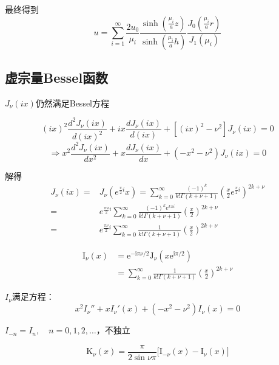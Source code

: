 \begin{ex}
\noindent 最终得到
$$u=\sum_{i=1}^{\infty}\frac{2u_{0}}{\mu_{i}}\frac{\sinh(\frac{\mu_{i}}{a}z)}{\sinh(\frac{\mu_{i}}{a}h)}\frac{J_{0}(\frac{\mu_{i}}{a}r)}{J_{1}(\mu_{i})}$$
\end{ex}

\subsection{虚宗量Bessel函数}
$J_\nu(ix)$仍然满足Bessel方程

$$(ix)^{2}\frac{d^{2}J_\nu(ix)}{d(ix)^{2}}+ix\frac{dJ_\nu(ix)}{d(ix)}+\left[\left(ix\right)^{2}-\nu^{2}\right]J_{\nu}(ix)=0$$
$$\Rightarrow x^{2}\frac{d^{2}J_\nu(ix)}{dx^{2}}+x\frac{dJ_\nu(ix)}{dx}+(-x^{2}-\nu^{2})J_\nu(ix)=0$$

解得
$$\begin{aligned}
    J_\nu(ix)=&J_\nu(e^{\frac{\pi}{2}i}x)=\sum_{k=0}^{\infty}\frac{(-1)^{k}}{k!\Gamma(k+\nu+1)}\left(\frac{x}{2}e^{\frac{\pi}{2}i}\right)^{2k+\nu}\\
    =&e^{\frac{\pi u}{2}i}\sum_{k=0}^{\infty}\frac{(-1)^{k}e^{k\pi i}}{k!\Gamma(k+\nu+1)}(\frac{x}{2})^{2k+\nu}\\
    =&e^{\frac{\pi \nu}{2}i}\sum_{k=0}^{\infty}\frac{1}{k!\Gamma(k+\nu+1)}(\frac{x}{2})^{2k+\nu}
\end{aligned}$$

\begin{dfn}[第一类虚宗量Bessel函数]
    $$\begin{aligned}
        \mathrm{I}_{\nu}(x)& =\mathrm{e}^{-\mathrm{i}\pi\nu/2}\mathrm{J}_{\nu}(x\mathrm{e}^{\mathrm{i}\pi/2})  \\
        &=\sum_{k=0}^\infty\frac1{k!\Gamma\left(k+\nu+1\right)}\left(\frac x2\right)^{2k+\nu}
        \end{aligned}$$

$I_\nu$满足方程：
$$\boxed{x^{2}I_\nu''+xI_\nu'(x)+(-x^{2}-\nu^{2})I_\nu(x)=0}$$

$I_{-n}=I_n,\quad n=0,1,2,\dots$，不独立

\end{dfn}
\begin{dfn}
    $$\mathrm{K}_\nu(x)=\frac\pi{2\sin\nu\pi}\Big[\mathrm{I}_{-\nu}(x)-\mathrm{I}_\nu(x)\Big]$$
\end{dfn}

